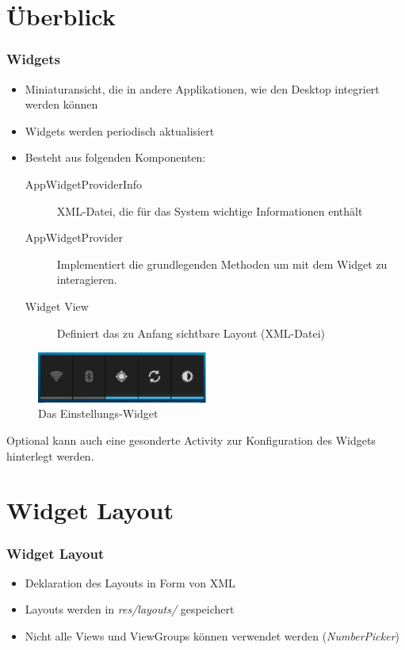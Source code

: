 \section{Überblick}
\begin{frame}[label=widgets]
   \frametitle{Widgets}
   \begin{itemize}
      \item Miniaturansicht, die in andere Applikationen, wie den Desktop integriert werden können
      \item Widgets werden periodisch aktualisiert
      \item Besteht aus folgenden Komponenten:
         \begin{description}
            \item[AppWidgetProviderInfo] XML-Datei, die für das System wichtige Informationen enthält
            \item[AppWidgetProvider] Implementiert die grundlegenden Methoden 
               um mit dem Widget zu interagieren.
            \item[Widget View] Definiert das zu Anfang sichtbare Layout (XML-Datei)
         \end{description}
   \end{itemize}

   \begin{figure}[h!]
      \centering
      \includegraphics[width=0.5\textwidth]{pictures/widget.eps}
      \caption{Das Einstellungs-Widget}
      \label{fig:widget}
   \end{figure}

   Optional kann auch eine gesonderte Activity zur Konfiguration des 
   Widgets hinterlegt werden.
\end{frame}

\section{Widget Layout}
\begin{frame}[label=widget_layout]
   \frametitle{Widget Layout}
   \begin{itemize}
      \item Deklaration des Layouts in Form von XML
      \item Layouts werden in \emph{res/layouts/} gespeichert
      \item Nicht alle Views und ViewGroups können verwendet werden (\emph{NumberPicker})
   \end{itemize}

   
\end{frame}

